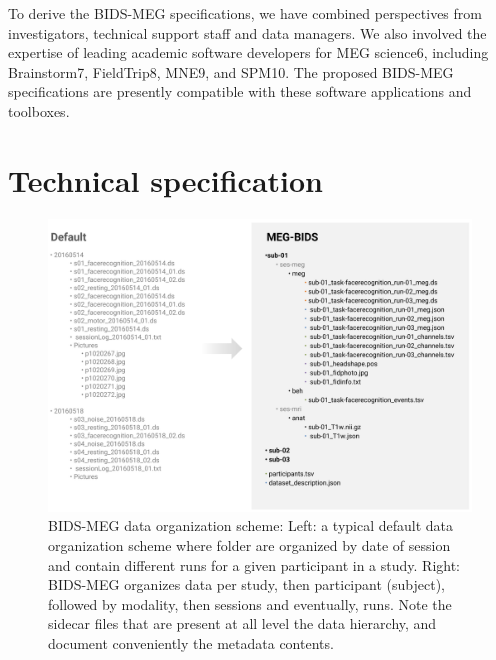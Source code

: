 To derive the BIDS-MEG specifications, we have combined perspectives from investigators, technical support staff and data managers. We also involved the expertise of leading academic software developers for MEG science6, including Brainstorm7, FieldTrip8, MNE9, and SPM10. The proposed BIDS-MEG specifications are presently compatible with these software applications and toolboxes.

\section{Technical specification}
\label{sec:BIDS-MEG}

\begin{figure}[htb!]
\begin{center}
   \includegraphics[width=\linewidth]{figures/bids_organization.png}
\end{center}
   \caption[BIDS-MEG data organization scheme.]{BIDS-MEG data organization scheme: Left: a typical default data organization scheme where folder are organized by date of session and contain different runs for a given participant in a study. Right: BIDS-MEG organizes data per study, then participant (subject), followed by modality, then sessions and eventually, runs. Note the sidecar files that are present at all level the data hierarchy, and document conveniently the metadata contents.}
   \label{fig:BIDS-MEG-organization}
\end{figure}


